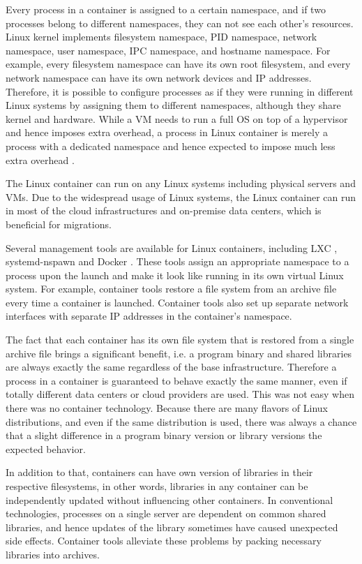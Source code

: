 Every process in a container is assigned to a certain namespace, and if two processes belong to different namespaces, they can not see each other's resources. 
Linux kernel implements filesystem namespace, PID namespace, network namespace, user namespace, IPC namespace, and hostname namespace. 
For example, every filesystem namespace can have its own root filesystem, and every network namespace can have its own network devices and IP addresses.
Therefore, it is possible to configure processes as if they were running in different Linux systems by assigning them to different namespaces, although they share kernel and hardware.
While a VM needs to run a full OS on top of a hypervisor and hence imposes extra overhead, a process in Linux container is merely a process with a dedicated namespace and hence expected to impose much less extra overhead \cite{felter2015updated}.

The Linux container can run on any Linux systems including physical servers and VMs.
Due to the widespread usage of Linux systems, the Linux container can run in most of the cloud infrastructures and on-premise data centers, which is beneficial for migrations.

Several management tools are available for Linux containers, including LXC \cite{noronha2018performance}, systemd-nspawn \cite{jedge2013} and Docker \cite{merkel2014docker}.
These tools assign an appropriate namespace to a process upon the launch and make it look like running in its own virtual Linux system.
For example, container tools restore a file system from an archive file every time a container is launched. 
Container tools also set up separate network interfaces with separate IP addresses in the container's namespace.

The fact that each container has its own file system that is restored from a single archive file brings a significant benefit, i.e. a program binary and shared libraries are always exactly the same regardless of the base infrastructure.
Therefore a process in a container is guaranteed to behave exactly the same manner, even if totally different data centers or cloud providers are used.
This was not easy when there was no container technology.
Because there are many flavors of Linux distributions, and even if the same distribution is used, there was always a chance that a slight difference in a program binary version or library versions  the expected behavior.

In addition to that, containers can have own version of libraries in their respective filesystems, in other words, libraries in any container can be independently updated without influencing other containers.
In conventional technologies, processes on a single server are dependent on common shared libraries, and hence updates of the library sometimes have caused unexpected side effects.
Container tools alleviate these problems by packing necessary libraries into archives. 

